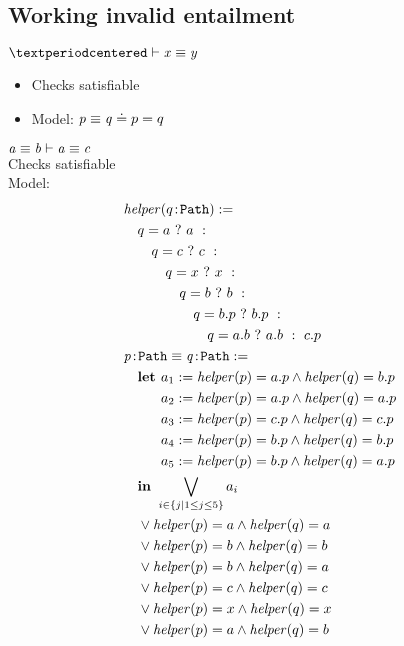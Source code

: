 \documentclass[a4paper]{article}
\begin{document}
\subsection{Working invalid entailment}
$\entails{·}{\pathEq{x}{y}}$
\begin{itemize}
  \item Checks satisfiable
  \item Model: $\mathit{p} \equiv \mathit{q} \doteq p=q$
\end{itemize}

$\mathit{a} \equiv \mathit{b} \vdash \mathit{a} \equiv \mathit{c}$\\
  Checks satisfiable\\
  Model:
  \begin{align*}
    &\helper(\sortedVar{q}{\Path}) :=\\&\quad
    \ite{q=a}{a}{\\&\qquad
      \ite{q=c}{c}{\\&\qquad\quad
        \ite{q=x}{x}{\\&\qquad\qquad
          \ite{q=b}{b}{\\&\qquad\qquad\quad
            \ite{q=b.p}{b.p}{\\&\qquad\qquad\qquad
              \ite{q=a.b}{a.b}{c.p}
            }
          }
        }
      }
    }\\
    &\pathEq{\sortedVar{p}{\Path}}{\sortedVar{q}{\Path}} :=\\&\quad
    \Let    a_1 := \helper(p)=a.p \land \helper(q)=b.p\\
    &\quad\phantom{{}\Let{}} a_2 := \helper(p)=a.p \land \helper(q)=a.p\\
    &\quad\phantom{{}\Let{}} a_3 := \helper(p)=c.p \land \helper(q)=c.p\\
    &\quad\phantom{{}\Let{}} a_4 := \helper(p)=b.p \land \helper(q)=b.p\\
    &\quad\phantom{{}\Let{}} a_5 := \helper(p)=b.p \land \helper(q)=a.p\\
    &\quad\In
    \bigvee_{i\in\{j | 1\leq j\leq5\}} a_i\\
    &\quad\lor \helper(p)=a \land \helper(q)=a\\
    &\quad\lor \helper(p)=b \land \helper(q)=b\\
    &\quad\lor \helper(p)=b \land \helper(q)=a\\
    &\quad\lor \helper(p)=c \land \helper(q)=c\\
    &\quad\lor \helper(p)=x \land \helper(q)=x\\
    &\quad\lor \helper(p)=a \land \helper(q)=b\\
  \end{align*}
\end{document}
